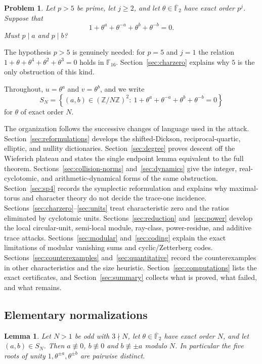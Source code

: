\documentclass[a4paper]{article}
\newtheorem{lemma}[theorem]{Lemma}
\newtheorem{problem}[theorem]{Problem}
\newcommand{\F}{\mathbb{F}}
\newcommand{\Z}{\mathbb{Z}}
\begin{document}
\begin{problem}\label{prob:main}
	Let $p>5$ be prime, let $j\geq2$, and let $\theta\in\overline{\F}_2$
	have exact order $p^j$.
	Suppose that
	\begin{equation}\label{eq:main}
		1+\theta^{a}+\theta^{-a}+\theta^{b}+\theta^{-b}=0 .
	\end{equation}
	Must $p\mid a$ and $p\mid b$?
\end{problem}

The hypothesis $p>5$ is genuinely needed: for $p=5$ and $j=1$ the relation
$1+\theta+\theta^{4}+\theta^{2}+\theta^{3}=0$ holds in $\F_{16}$.
Section~\ref{sec:charzero} explains why $5$ is the only obstruction of this
kind.

Throughout, $u=\theta^a$ and $v=\theta^b$, and we write
\[
	S_{N}=\left\{(a,b)\in(\Z/N\Z)^2:\ 1+\theta^{a}+\theta^{-a}+\theta^{b}+\theta^{-b}=0\right\}
\]
for $\theta$ of exact order $N$.

The organization follows the successive changes of language used in the
attack.  Section~\ref{sec:reformulations} develops the shifted-Dickson,
reciprocal-quartic, elliptic, and nullity dictionaries.
Section~\ref{sec:degree} proves descent off the Wieferich plateau and states
the single endpoint lemma equivalent to the full theorem.
Sections~\ref{sec:collision-norms} and~\ref{sec:dynamics} give the integer,
real-cyclotomic, and arithmetic-dynamical forms of the same obstruction.
Section~\ref{sec:sp4} records the symplectic reformulation and explains why
maximal-torus and character theory do not decide the trace-one incidence.
Sections~\ref{sec:charzero}--\ref{sec:units} treat characteristic zero and
the ratios eliminated by cyclotomic units.
Sections~\ref{sec:reduction} and~\ref{sec:power} develop the local
circular-unit, semi-local module, ray-class, power-residue, and additive
trace attacks.
Sections~\ref{sec:modular} and~\ref{sec:coding} explain the exact limitations
of modular vanishing sums and cyclic/Zetterberg codes.
Sections~\ref{sec:counterexamples} and~\ref{sec:quantitative} record the
counterexamples in other characteristics and the size heuristic.
Section~\ref{sec:computations} lists the exact certificates, and
Section~\ref{sec:summary} collects what is proved, what failed, and what
remains.
\subsection{Elementary normalizations}

\begin{lemma}\label{lem:degenerate}
	Let $N>1$ be odd with $3\nmid N$, let $\theta\in\overline{\F}_2$ have
	exact order $N$, and let $(a,b)\in S_N$.
	Then $a\not\equiv0$, $b\not\equiv0$ and $b\not\equiv\pm a$ modulo $N$.
	In particular the five roots of unity $1,\theta^{\pm a},\theta^{\pm b}$
	are pairwise distinct.
\end{lemma}
\end{document}

